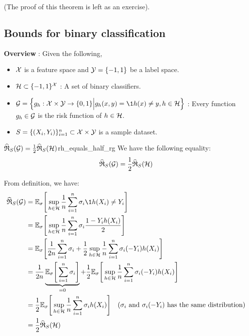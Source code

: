 \begin{proof*}
    (The proof of this theorem is left as an exercise).
\end{proof*}


\subsection{Bounds for binary classification}
\textbf{Overview} : Given the following, 
\begin{itemize}
    \item $\mathcal{X}$ is a feature space and $\mathcal{Y}=\{-1, 1\}$ be a label space.
    \item $\mathcal{H}\subset\{-1, 1\}^{\mathcal{X}}$ : A set of binary classifiers.
    \item $\G=\bigCurl{ g_h : \X\times\Y \to \{0,1\} \Big| g_h(x, y) = \1{h(x)\ne y}, h\in\Hf }$ : Every function $g_h\in\mathcal{G}$ is the risk function of $h\in\mathcal{H}$.
    \item $S=\{(X_i, Y_i)\}_{i=1}^n\subset \mathcal{X}\times \mathcal{Y}$ is a sample dataset.
\end{itemize}

\begin{lemma}{$\widehat{\mathfrak{R}}_S(\mathcal{G}) = \frac{1}{2}\widehat{\mathfrak{R}}_S(\mathcal{H})$}{rh_equals_half_rg}
    We have the following equality:
    \begin{align*}
        \widehat{\mathfrak{R}}_S(\mathcal{G}) = \frac{1}{2}\widehat{\mathfrak{R}}_S(\mathcal{H})
    \end{align*}
\end{lemma}

\begin{proof*}
    From definition, we have:
    \begin{align*}
        \ERC_S(\G) 
            &= \E_\sigma\biggSquare{
                \sup_{h\in\Hf} \frac{1}{n} \sum_{i=1}^n \sigma_i \1{h(X_i)\ne Y_i} 
            } \\
            &= \E_\sigma\biggSquare{
                \sup_{h\in\Hf} \frac{1}{n} \sum_{i=1}^n \sigma_i \frac{1-Y_ih(X_i)}{2} 
            } \\
            &= \E_\sigma\biggSquare{
                \frac{1}{2n}\sum_{i=1}^n \sigma_i + \frac{1}{2}\sup_{h\in \Hf}\frac{1}{n} \sum_{i=1}^n \sigma_i(-Y_i)h(X_i)
            } \\ 
            &= \frac{1}{2n} \underbrace{\E_\sigma\biggSquare{
                \sum_{i=1}^n \sigma_i
            }}_{=0} + \frac{1}{2}\E_\sigma\biggSquare{
                \sup_{h\in \Hf}\frac{1}{n} \sum_{i=1}^n \sigma_i(-Y_i)h(X_i)
            } \\
            &= \frac{1}{2}\E_\sigma\biggSquare{
                \sup_{h\in \Hf}\frac{1}{n} \sum_{i=1}^n \sigma_i h(X_i)
            } \ \ \ (\sigma_i \text{ and } \sigma_i(-Y_i) \text{ has the same distribution}) \\
            &= \frac{1}{2}\ERC_S(\Hf)
    \end{align*}
\end{proof*}

